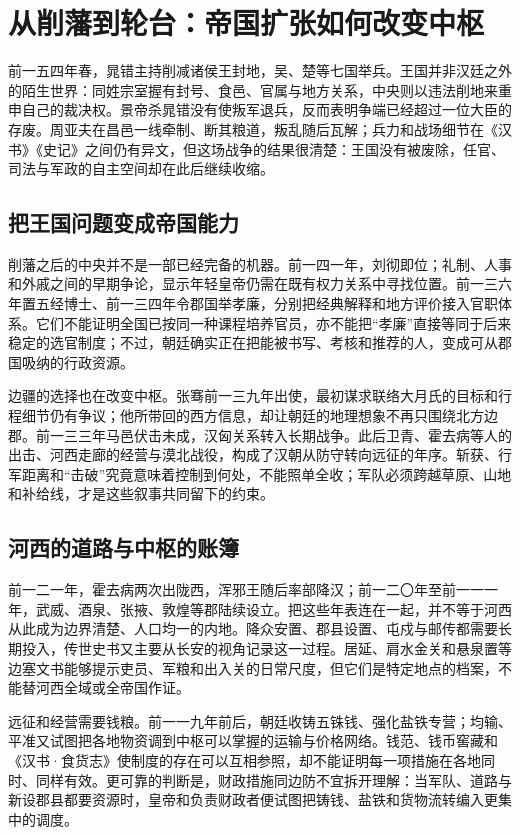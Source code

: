 \section{从削藩到轮台：帝国扩张如何改变中枢}
\label{sec:western-han-expansion-regency}

前一五四年春，晁错主持削减诸侯王封地，吴、楚等七国举兵。王国并非汉廷之外的陌生世界：同姓宗室握有封号、食邑、官属与地方关系，中央则以违法削地来重申自己的裁决权。景帝杀晁错没有使叛军退兵，反而表明争端已经超过一位大臣的存废。周亚夫在昌邑一线牵制、断其粮道，叛乱随后瓦解；兵力和战场细节在《汉书》《史记》之间仍有异文，但这场战争的结果很清楚：王国没有被废除，任官、司法与军政的自主空间却在此后继续收缩。

\subsection{把王国问题变成帝国能力}

削藩之后的中央并不是一部已经完备的机器。前一四一年，刘彻即位；礼制、人事和外戚之间的早期争论，显示年轻皇帝仍需在既有权力关系中寻找位置。前一三六年置五经博士、前一三四年令郡国举孝廉，分别把经典解释和地方评价接入官职体系。它们不能证明全国已按同一种课程培养官员，亦不能把“孝廉”直接等同于后来稳定的选官制度；不过，朝廷确实正在把能被书写、考核和推荐的人，变成可从郡国吸纳的行政资源。

边疆的选择也在改变中枢。张骞前一三九年出使，最初谋求联络大月氏的目标和行程细节仍有争议；他所带回的西方信息，却让朝廷的地理想象不再只围绕北方边郡。前一三三年马邑伏击未成，汉匈关系转入长期战争。此后卫青、霍去病等人的出击、河西走廊的经营与漠北战役，构成了汉朝从防守转向远征的年序。斩获、行军距离和“击破”究竟意味着控制到何处，不能照单全收；军队必须跨越草原、山地和补给线，才是这些叙事共同留下的约束。

\subsection{河西的道路与中枢的账簿}

前一二一年，霍去病两次出陇西，浑邪王随后率部降汉；前一二〇年至前一一一年，武威、酒泉、张掖、敦煌等郡陆续设立。把这些年表连在一起，并不等于河西从此成为边界清楚、人口均一的内地。降众安置、郡县设置、屯戍与邮传都需要长期投入，传世史书又主要从长安的视角记录这一过程。居延、肩水金关和悬泉置等边塞文书能够提示吏员、军粮和出入关的日常尺度，但它们是特定地点的档案，不能替河西全域或全帝国作证。

远征和经营需要钱粮。前一一九年前后，朝廷收铸五铢钱、强化盐铁专营；均输、平准又试图把各地物资调到中枢可以掌握的运输与价格网络。钱范、钱币窖藏和《汉书·食货志》使制度的存在可以互相参照，却不能证明每一项措施在各地同时、同样有效。更可靠的判断是，财政措施同边防不宜拆开理解：当军队、道路与新设郡县都要资源时，皇帝和负责财政者便试图把铸钱、盐铁和货物流转编入更集中的调度。

